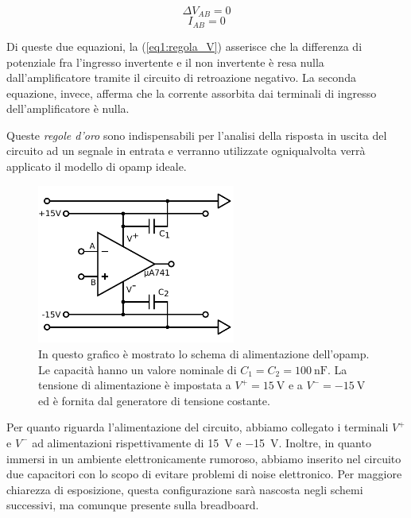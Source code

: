 \begin{equation}
\Delta V_{AB}=0
\label{eq1:regola_V}
\end{equation}
\begin{equation}
I_{AB}=0
\label{eq1:regola_I}
\end{equation}

Di queste due equazioni, la (\ref{eq1:regola_V}) asserisce che la differenza di potenziale fra l'ingresso invertente e il non invertente è resa nulla dall'amplificatore tramite il circuito di retroazione negativo.
La seconda equazione, invece, afferma che la corrente assorbita dai terminali di ingresso dell'amplificatore è nulla.

Queste \textit{regole d'oro} sono indispensabili per l'analisi della risposta in uscita del circuito ad un segnale in entrata e verranno utilizzate ogniqualvolta verrà applicato il modello di opamp ideale.

\begin{figure}
 \centering
	\includegraphics[width=6.5cm]{../E01/latex/alimentazione.pdf}
	\caption{In questo grafico è mostrato lo schema di alimentazione dell'opamp. Le capacità hanno un valore nominale di $C_1=C_2= \SI{100}{\nano\farad}$. La tensione di alimentazione è impostata a $V^+ = \SI{15}{\volt}$ e a $V^- = \SI{-15}{\volt}$ ed è fornita dal generatore di tensione costante.\\
\newline\newline\newline}
 \label{cir1:costante}
\end{figure}

Per quanto riguarda l'alimentazione del circuito, abbiamo collegato i terminali $V^+$ e $V^-$ ad alimentazioni rispettivamente di \SI{+15}{\volt} e \SI{-15}{\volt}. Inoltre, in quanto immersi in un ambiente elettronicamente rumoroso, abbiamo inserito nel circuito due capacitori con lo scopo di evitare problemi di noise elettronico.
Per maggiore chiarezza di esposizione, questa configurazione sarà nascosta negli schemi successivi, ma comunque presente sulla breadboard.

